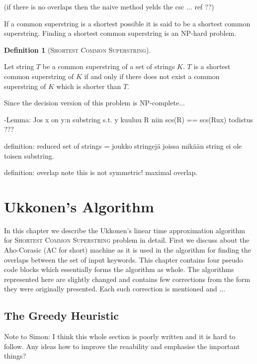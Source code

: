 \documentclass[english,twoside,censored,csm,algorithms-track-2020]{HYthesisML}
\theoremstyle{plain}
\theoremstyle{definition}
\newtheorem{definition}[equation]{Definition}
\begin{document}
(if there is no overlaps then the naive method yelds the csc ... ref ??)

If a common superstring is a shortest possible it is said to be a shortest common superstring. Finding a shortest common superstring is
an \textsc{NP}-hard problem. 

\begin{definition}[\textsc{Shortest Common Superstring}]~\label{def-scs}

  Let string $T$ be a common superstring of a set of strings $K$.
  $T$ is a shortest common superstring of $K$ if and only if there does not exist a common superstring of $K$ which is shorter than $T$.
  
\end{definition}

Since the decision version of this problem is NP-complete... \citep{Garey79}

-Lemma: Jos x on y:n substring s.t. y kuuluu R niin scs(R) == scs(Rux)
todistus ???

definition: reduced set of strings = joukko stringejä joissa mikään string ei ole toisen substring.

definition: overlap note this is not symmetric!
maximal overlap.


\chapter{Ukkonen's Algorithm}

In this chapter we describe the Ukkonen's linear time approximation algorithm for
\textsc{Shortest Common Superstring} problem in detail. First we discuss about the
Aho-Corasic (AC for short) machine as it is used in the algorithm for finding the overlaps
between the set of input keywords. This chapter contains four pseudo code blocks which
essentially forms the algorithm as whole. The algorithms represented here are slightly changed
and contains few corrections from the form they were originally presented. Each such
correction is mentioned and ...

\listofalgorithms

\section{The Greedy Heuristic}

Note to Simon: I think this whole section is poorly written and it is hard to follow. Any
ideas how to improve the reaability and emphasise the important things?
\end{document}
